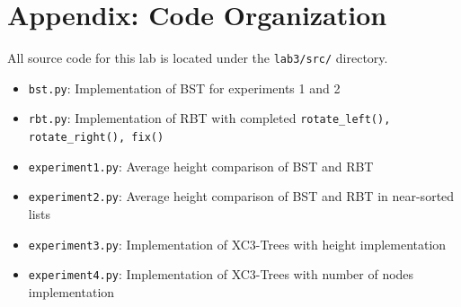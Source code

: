 \documentclass[letterpaper]{article}
\theoremstyle{plain}
\theoremstyle{definition}
\theoremstyle{remark}
\newcounter{experiment}
\begin{document}
\section*{Appendix: Code Organization}
All source code for this lab is located under the \texttt{lab3/src/} directory.
\begin{itemize}
    \item \texttt{bst.py}: Implementation of BST for experiments 1 and 2
    \item \texttt{rbt.py}: Implementation of RBT with completed \texttt{rotate\_left(), rotate\_right(), fix()}
    \item \texttt{experiment1.py}: Average height comparison of BST and RBT
    \item \texttt{experiment2.py}: Average height comparison of BST and RBT in near-sorted lists
    \item \texttt{experiment3.py}: Implementation of XC3-Trees with height implementation
    \item \texttt{experiment4.py}: Implementation of XC3-Trees with number of nodes implementation
\end{itemize}
\end{document}
